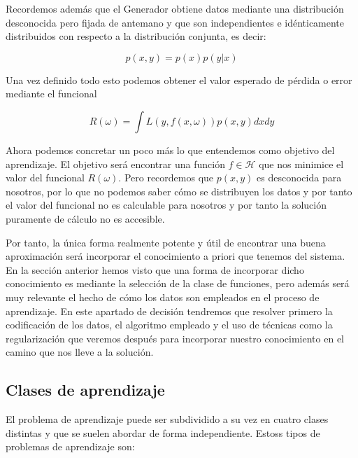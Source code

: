 Recordemos además que el Generador obtiene datos mediante una distribución desconocida pero fijada de antemano y que son independientes e idénticamente distribuidos con respecto a la distribución conjunta, es decir:

$$p(x,y) = p(x)p(y|x)$$

Una vez definido todo esto podemos obtener el valor esperado de pérdida o error mediante el funcional

$$R(\omega) = \int L(y,f(x,\omega))p(x,y)dxdy$$

Ahora podemos concretar un poco más lo que entendemos como objetivo del aprendizaje. El objetivo será encontrar una función $f\in \mathcal{H}$ que nos minimice el valor del funcional $R(\omega)$. Pero recordemos que $p(x,y)$ es desconocida para nosotros, por lo que no podemos saber cómo se distribuyen los datos y por tanto el valor del funcional no es calculable para nosotros y por tanto la solución puramente de cálculo no es accesible.

Por tanto, la única forma realmente potente y útil de encontrar una buena aproximación será incorporar el conocimiento a priori que tenemos del sistema. En la sección anterior hemos visto que una forma de incorporar dicho conocimiento es mediante la selección de la clase de funciones, pero además será muy relevante el hecho de cómo los datos son empleados en el proceso de aprendizaje. En este apartado de decisión tendremos que resolver primero la codificación de los datos, el algoritmo empleado y el uso de técnicas como la regularización que veremos después para incorporar nuestro conocimiento en el camino que nos lleve a la solución.

\subsection{Clases de aprendizaje}

El problema de aprendizaje puede ser subdividido a su vez en cuatro clases distintas y que se suelen abordar de forma independiente. Estoss tipos de problemas de aprendizaje son:


